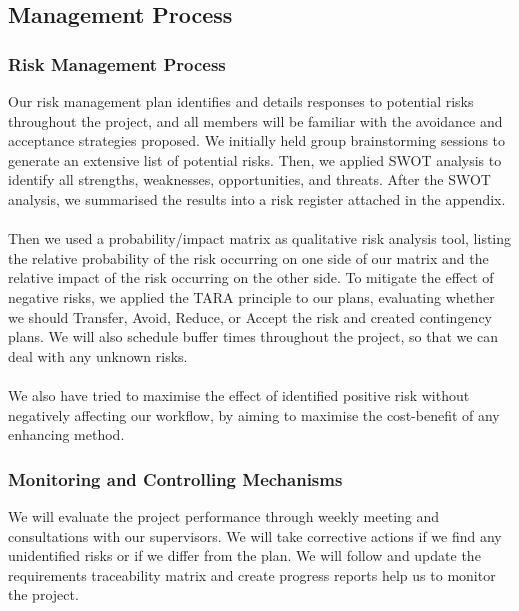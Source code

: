 \documentclass[a4paper, 12pt]{article}
\begin{document}
    \subsection{Management Process}
        \subsubsection{Risk Management Process}
        Our risk management plan identifies and details responses to potential risks throughout the project, and all members will be familiar with the avoidance and acceptance strategies proposed. We initially held group brainstorming sessions to generate an extensive list of potential risks. Then, we applied SWOT analysis to identify all strengths, weaknesses, opportunities, and threats.
        After the SWOT analysis, we summarised the results into a risk register attached in the appendix. 
        \\\\
        Then we used a probability/impact matrix as qualitative risk analysis tool, listing the relative probability of the risk occurring on one side of our matrix and the relative impact of the risk occurring  on the other side. To mitigate the effect of negative risks, we applied the TARA principle to our plans, evaluating whether we should Transfer, Avoid, Reduce, or Accept the risk and created contingency plans. We will also schedule buffer times throughout the project, so that we can deal with any unknown risks.
        \\\\
        We also have tried to maximise the effect of identified positive risk without negatively affecting our workflow, by aiming to maximise the cost-benefit of any enhancing method.
        
        \subsubsection{Monitoring and Controlling Mechanisms}
        We will evaluate the project performance through weekly meeting and consultations with our supervisors. We will take corrective actions if we find any unidentified risks or if we differ from the plan. We will follow and update the requirements traceability matrix and create progress reports help us to monitor the project.
        
\end{document}
